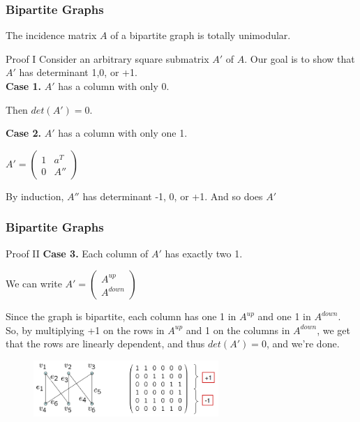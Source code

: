 \documentclass{beamer}
\begin{document}
\begin{frame}\frametitle{Bipartite Graphs}
\begin{block}{}
The incidence matrix $A$ of a bipartite graph is totally unimodular.
\end{block}
\begin{block}{Proof I} 
Consider an arbitrary square submatrix $A'$ of $A$. Our goal is to show that $A'$ has determinant ­1,0, or +1. \\
\textbf{Case 1.} $A'$ has a column with only 0. \\
\centerline{Then $det(A') = 0$.}
\textbf{Case 2.} $A'$ has a column with only one 1. \\
\centerline{$A' = \begin{pmatrix}
1& a^T \\
0& A''
\end{pmatrix}$}
By induction, $A''$ has determinant -1, 0, or +1. And so does $A'$
\end{block}
\end{frame}

\begin{frame}\frametitle{Bipartite Graphs}
\begin{block}{Proof II}
\textbf{Case 3.} Each column of $A'$ has exactly two 1. \\
\centerline{We can write $A' = \begin{pmatrix}
A^{up} \\
A^{down}
\end{pmatrix}$}
Since the graph is bipartite, each column has one 1 in $A^{up}$ and one 1 in $A^{down}$. \\
So, by multiplying +1 on the rows in $A^{up}$ and ­1 on the columns in $A^{down}$, we get that the rows are linearly dependent, and thus $det(A') = 0$, and we’re done.
\begin{figure}[h]
\includegraphics[width=7cm]{picture2}
\end{figure}
\end{block}
\end{frame}
\end{document}
